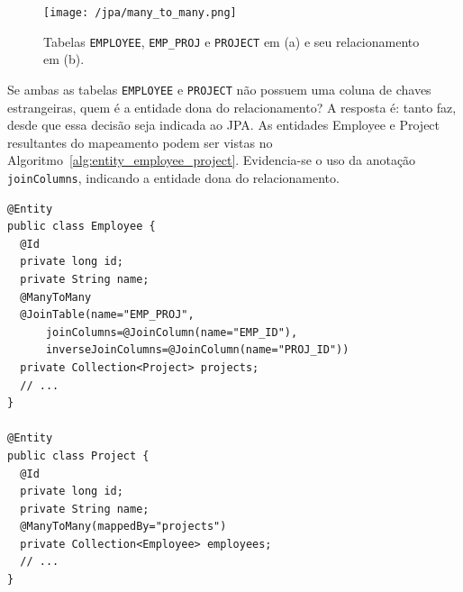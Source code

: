 \documentclass[
  10.5pt,				  %
	openright,			%
	twoside,			  %
  a5paper,
  chapter=TITLE,	%
	section=TITLE,	%
  hyphens,        %
	english,        %
	brazil          %
]{abntex2}
\begin{document}
\begin{figure}[!ht]
  \caption{\label{fig:jpa_manytomany} Tabelas \texttt{EMPLOYEE},  \texttt{EMP\_PROJ} e \texttt{PROJECT} em (a) e seu relacionamento em (b).}
  \begin{center}
    \texttt{[image: /jpa/many\_to\_many.png]}
  \end{center}
\end{figure}

Se ambas as tabelas \texttt{EMPLOYEE} e \texttt{PROJECT} não possuem uma coluna de chaves estrangeiras, quem é a entidade dona do relacionamento? A resposta é: tanto faz, desde que essa decisão seja indicada ao JPA. As entidades Employee e Project resultantes do mapeamento podem ser vistas no Algoritmo~\ref{alg:entity_employee_project}. Evidencia-se o uso da anotação \texttt{joinColumns}, indicando a entidade dona do relacionamento.


\begin{lstlisting}[caption={Classes Employee e Project.}, label={alg:entity_employee_project}]
@Entity
public class Employee {
  @Id
  private long id;
  private String name;
  @ManyToMany
  @JoinTable(name="EMP_PROJ",
      joinColumns=@JoinColumn(name="EMP_ID"),
      inverseJoinColumns=@JoinColumn(name="PROJ_ID"))
  private Collection<Project> projects;
  // ...
}

@Entity
public class Project {
  @Id
  private long id;
  private String name;
  @ManyToMany(mappedBy="projects")
  private Collection<Employee> employees;
  // ...
}
\end{lstlisting}
%
\end{document}
